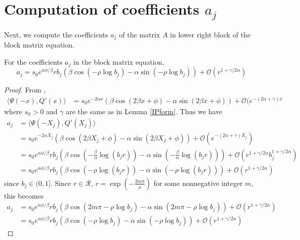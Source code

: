 \documentclass[thesis.tex]{subfiles}
\begin{document}
\section{Computation of coefficients $a_j$}

Next, we compute the coefficients $a_j$ of the matrix $A$ in lower right block of the block matrix equation.

\begin{lemma}\label{lemma:ajparam}
For the coefficients $a_j$ in the block matrix equation, 
\begin{equation}\label{ajparam}
a_j = s_0 e^{\alpha \phi/\beta} r b_j \left( \beta \cos\left(-\rho \log b_j \right) - \alpha \sin \left(-\rho \log b_j \right) \right) + \mathcal{O}(r^{1+\gamma/2\alpha})
\end{equation}

\begin{proof}
From \cite[Lemma 6.1]{Sandstede1998},
\begin{align*}\label{IPpsiQprime}
\langle \Psi(-x), Q'(x) \rangle
&= s_0 e^{-2 \alpha x}\left( \beta \cos(2 \beta x + \phi) - \alpha \sin(2 \beta x + \phi)\right) + \mathcal{O}(e^{-(2 \alpha + \gamma) x}
\end{align*}
where $s_0 > 0$ and $\gamma$ are the same as in Lemma \ref{IPform}. Thus we have
\begin{align*}
a_j &= \langle \Psi(-X_j), Q'(X_j) \rangle \\
&= s_0 e^{-2 \alpha X_j}\left( \beta \cos(2 \beta X_j + \phi) - \alpha \sin(2 \beta X_j + \phi)\right) + \mathcal{O}(e^{-(2 \alpha + \gamma) X_j}) \\
&= s_0 e^{\alpha \phi/\beta} r b_j \left( \beta \cos\left( -\frac{\beta}{\alpha} \log(b_j r) \right) - \alpha \sin \left( -\frac{\beta}{\alpha} \log(b_j r) \right) \right) + \mathcal{O}(r^{1+\gamma/2\alpha} b_j^{1 + \gamma/2\alpha}) \\
&= s_0 e^{\alpha \phi/\beta} r b_j \left( \beta \cos\left( -\rho \log(b_j r) \right) - \alpha \sin \left( -\rho \log(b_j r) \right) \right) + \mathcal{O}(r^{1+\gamma/2\alpha})
\end{align*}
since $b_j \in (0, 1]$. Since $r \in \mathcal{R}$, $r = \exp\left(-\frac{2 m \pi}{\rho}\right)$ for some nonnegative integer $m$, this becomes 
\begin{align*}
a_j &= s_0 e^{\alpha \phi/\beta} r b_j \left( \beta \cos\left( 2 m \pi -\rho \log b_j \right) - \alpha \sin \left( 2 m \pi -\rho \log b_j \right) \right) + \mathcal{O}(r^{1+\gamma/2\alpha}) \\
&= s_0 e^{\alpha \phi/\beta} r b_j \left( \beta \cos\left(-\rho \log b_j \right) - \alpha \sin \left(-\rho \log b_j \right) \right) + \mathcal{O}(r^{1+\gamma/2\alpha})
\end{align*}
\end{proof}
\end{lemma}
\end{document}
